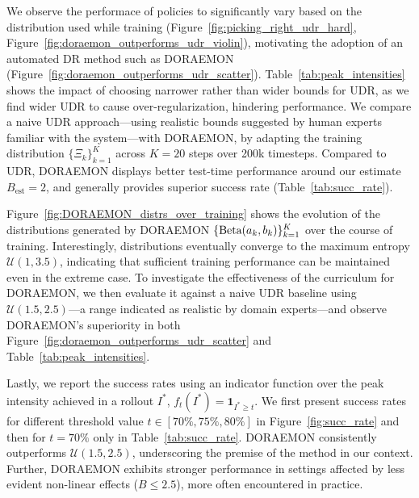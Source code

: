 We observe the performace of policies to significantly vary based on the distribution used while training (Figure~\ref{fig:picking_right_udr_hard}, Figure~\ref{fig:doraemon_outperforms_udr_violin}), motivating the adoption of an automated DR method such as DORAEMON (Figure~\ref{fig:doraemon_outperforms_udr_scatter}).
Table~\ref{tab:peak_intensities} shows the impact of choosing narrower rather than wider bounds for UDR, as we find wider UDR to cause over-regularization, hindering performance.
We compare a naive UDR approach---using realistic bounds suggested by human experts familiar with the system---with DORAEMON, by adapting the training distribution \( \{ \Xi_{k} \}_{k=1}^K\) across \( K=20 \) steps over 200k timesteps. Compared to UDR, DORAEMON displays better test-time performance around our estimate \( B_{\text{est}} = 2 \), and generally provides superior success rate (Table~\ref{tab:succ_rate}).

Figure~\ref{fig:DORAEMON_distrs_over_training} shows the evolution of the distributions generated by DORAEMON \(\{\text{Beta}(a_k, b_k) \}_{k=1}^{K} \) over the course of training. Interestingly, distributions eventually converge to the maximum entropy \( \mathcal U(1, 3.5) \), indicating that sufficient training performance can be maintained even in the extreme case. To investigate the effectiveness of the curriculum for DORAEMON, we then evaluate it against a naive UDR baseline using \( \mathcal U(1.5, 2.5) \)---a range indicated as realistic by domain experts---and observe DORAEMON's superiority in both Figure~\ref{fig:doraemon_outperforms_udr_scatter} and Table~\ref{tab:peak_intensities}.

Lastly, we report the success rates using an indicator function over the peak intensity achieved in a rollout \( I^* \), \(f_t(I^*) = \mathbf{1}_{I^* \geq t} \). We first present success rates for different threshold value \( t \in [70\%, 75\%, 80\%] \) in Figure~\ref{fig:succ_rate} and then for \( t = 70\% \) only in Table~\ref{tab:succ_rate}.
DORAEMON consistently outperforms \( \mathcal{U}(1.5, 2.5) \), underscoring the premise of the method in our context. Further, DORAEMON exhibits stronger performance in settings affected by less evident non-linear effects (\( B \leq 2.5 \)), more often encountered in practice.

